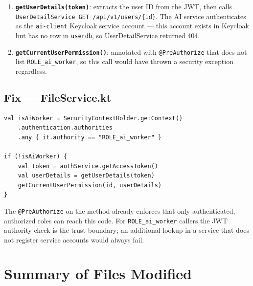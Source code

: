 \documentclass[11pt,a4paper]{article}
\begin{document}
\begin{enumerate}
  \item \textbf{\texttt{getUserDetails(token)}}: extracts the user ID from the
        JWT, then calls \texttt{UserDetailService GET /api/v1/users/\{id\}}.
        The AI service authenticates as the \texttt{ai-client} Keycloak service
        account --- this account exists in Keycloak but has no row in
        \texttt{userdb}, so UserDetailService returned 404.

  \item \textbf{\texttt{getCurrentUserPermission()}}: annotated with
        \texttt{@PreAuthorize} that does not list \texttt{ROLE\_ai\_worker},
        so this call would have thrown a security exception regardless.
\end{enumerate}

\subsection{Fix --- FileService.kt}

\begin{lstlisting}[style=kotlin, caption={FileService.kt --- downloadFile()}]
val isAiWorker = SecurityContextHolder.getContext()
    .authentication.authorities
    .any { it.authority == "ROLE_ai_worker" }

if (!isAiWorker) {
    val token = authService.getAccessToken()
    val userDetails = getUserDetails(token)
    getCurrentUserPermission(id, userDetails)
}
\end{lstlisting}

The \texttt{@PreAuthorize} on the method already enforces that only
authenticated, authorized roles can reach this code.  For
\texttt{ROLE\_ai\_worker} callers the JWT authority check is the trust boundary;
an additional lookup in a service that does not register service accounts would
always fail.

\section{Summary of Files Modified}
\end{document}
